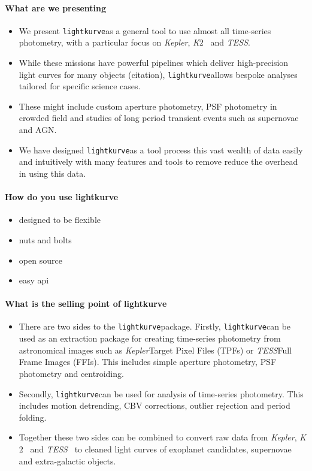 \documentclass[twocolumn]{aastex62}
\newcommand{\ktwo}{{\it K$\mathit{2}$}}
\newcommand{\tess}{{\it TESS}}
\newcommand{\kepler}{{\it Kepler}}
\newcommand{\lightkurve}{\texttt{lightkurve}}
\begin{document}
\paragraph{What are we presenting}
\begin{itemize}
\item{We present \lightkurve as a general tool to use almost all time-series photometry, with a particular focus on \kepler, \ktwo~ and \tess.}
\item While these missions have powerful pipelines which deliver high-precision light curves for many objects (citation), \lightkurve allows bespoke analyses tailored for specific science cases.
\item These might include custom aperture photometry, PSF photometry in crowded field and studies of long period transient events such as supernovae and AGN.
\item{We have designed \lightkurve as a tool process this vast wealth of data easily and intuitively with many features and tools to remove reduce the overhead in using this data.}
\end{itemize}


\paragraph{How do you use lightkurve}
\begin{itemize}
\item designed to be flexible
\item nuts and bolts
\item open source
\item easy api
\end{itemize}

\paragraph{What is the selling point of lightkurve}
\begin{itemize}
\item There are two sides to the \lightkurve package. Firstly, \lightkurve can be used as an extraction package for creating time-series photometry from astronomical images such as \kepler Target Pixel Files (TPFs) or \tess Full Frame Images (FFIs). This includes simple aperture photometry, PSF photometry and centroiding.
\item Secondly, \lightkurve can be used for analysis of time-series photometry. This includes motion detrending, CBV corrections, outlier rejection and period folding.
\item Together these two sides can be combined to convert raw data from \kepler, \ktwo~ and \tess~ to cleaned light curves of exoplanet candidates, supernovae and extra-galactic objects.
\end{itemize}
\end{document}
